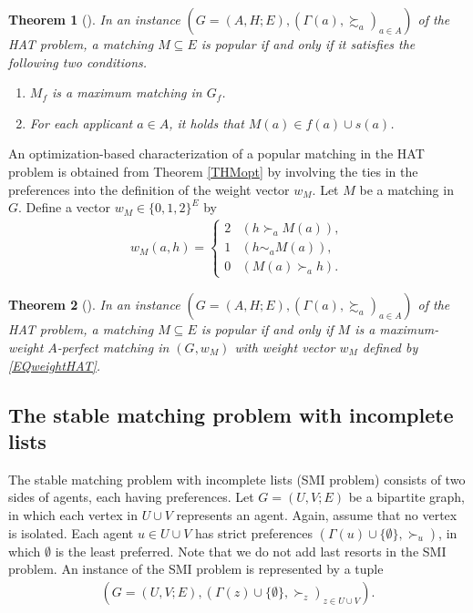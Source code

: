 \documentclass[11pt,a4paper,showkeys]{article}
\theoremstyle{plain}
\newtheorem{theorem}{Theorem}[section]
\theoremstyle{definition}
\begin{document}
\begin{theorem}[\cite{AIKM07}]
    \label{THMgraphHAT}
    In an instance $(G=(A,H;E),(\Gamma(a),\succsim_a)_{a\in A})$ of the HAT problem, 
    a matching $M\subseteq E$ is popular if and only if it satisfies the following two conditions. 
    \begin{enumerate}
        \item $M_f$ is a maximum matching in $G_f$.
        \label{ENUgraphHAT1}
        \item For each applicant $a\in A$, it holds that $M(a)\in f(a)\cup s(a)$. 
        \label{ENUgraphHAT2}
    \end{enumerate}
\end{theorem}

An optimization-based characterization of a popular matching in the HAT problem is obtained from Theorem \ref{THMopt} by 
involving the ties in the preferences into the definition of the weight vector $w_M$. 
Let $M$ be a matching in $G$. 
Define a vector $w_M\in \{0,1,2\}^E$ by 
\begin{align}
    \label{EQweightHAT}
    w_M(a,h)=
    \begin{cases}
        2 & (h \succ_a M(a)), \\
        1 & (h \sim_a M(a)), \\
        0 & (M(a) \succ_a h). 
    \end{cases}
\end{align}

\begin{theorem}[\cite{KMN11,McC08}]
    \label{THMoptHAT}
    In an instance $(G=(A,H;E),(\Gamma(a),\succsim_a)_{a\in A})$ of the HAT problem, 
    a matching $M\subseteq E$ is popular if and only if $M$ is a maximum-weight $A$-perfect matching in $(G,w_M)$ 
    with weight vector $w_M$ defined by \eqref{EQweightHAT}. 
\end{theorem}


\subsection{The stable matching problem with incomplete lists}


The stable matching problem with incomplete lists (SMI problem) consists of two sides of agents, 
each having preferences. 
Let $G=(U,V;E)$ be a bipartite graph, 
in which each vertex in $U\cup V$ represents an agent. 
Again, 
assume that no vertex is isolated. 
Each agent $u\in U\cup V$ has strict preferences $(\Gamma(u) \cup \{\emptyset\}, \succ_u)$, 
in which $\emptyset$ is the least preferred. 
Note that we do not add last resorts in the SMI problem. 
An instance of the SMI problem is represented by a tuple 
\begin{align*}
    (G=(U,V;E),(\Gamma(z)\cup \{\emptyset\},\succ_z)_{z\in U\cup V}). 
\end{align*}
\end{document}
